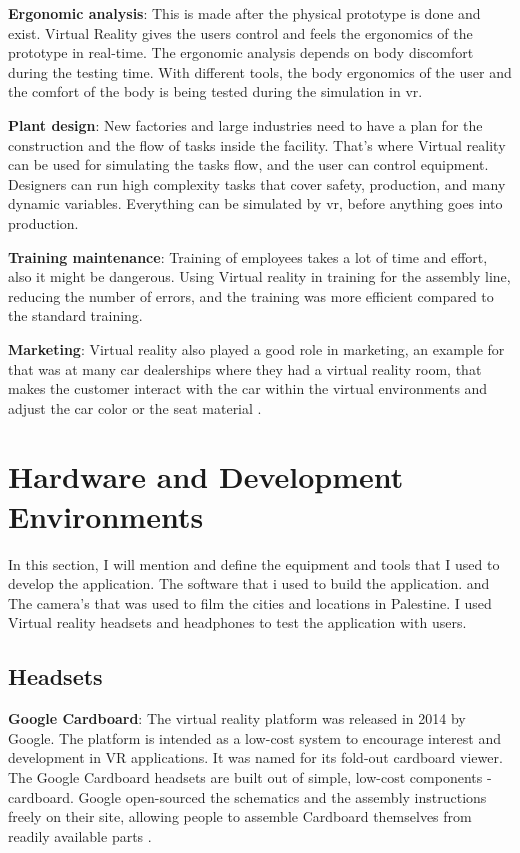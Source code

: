\textbf{Ergonomic analysis}: This is made after the physical prototype is done and exist. Virtual Reality gives the users control and feels the ergonomics of the prototype in real-time. The ergonomic analysis depends on body discomfort during the testing time. With different tools, the body ergonomics of the user and the comfort of the body is being tested during the simulation in \acrshort{vr}. 

\textbf{Plant design}: New factories and large industries need to have a plan for the construction and the flow of tasks inside the facility. That's where Virtual reality can be used for simulating the tasks flow, and the user can control equipment. Designers can run high complexity tasks that cover safety, production, and many dynamic variables. Everything can be simulated by \acrshort{vr}, before anything goes into production.  

\textbf{Training maintenance}:  Training of employees takes a lot of time and effort, also it might be dangerous. Using Virtual reality in training for the assembly line, reducing the number of errors, and the training was more efficient compared to the standard training.

\textbf{Marketing}: Virtual reality also played a good role in marketing, an example for that was at many car dealerships where they had a virtual reality room, that makes the customer interact with the car within the virtual environments and adjust the car color or the seat material \citep{burdea2017virtual}.

\section{Hardware and Development Environments}

In this section, I will mention and define the equipment and tools that I used to develop the application. The software that i used to build the application. and The camera's that was used to film the cities and locations in Palestine. I used Virtual reality headsets and headphones to test the application with users.


\subsection{Headsets}

\textbf{Google Cardboard}: The virtual reality platform was released in
2014 by Google. The platform is intended as a low-cost system to
encourage interest and development in VR applications. It was
named for its fold-out cardboard viewer. The Google Cardboard
headsets are built out of simple, low-cost components -
cardboard. Google open-sourced the schematics and the
assembly instructions freely on their site, allowing people to
assemble Cardboard themselves from readily available parts \citep{Prasuethsut2014GoogleReview}.


